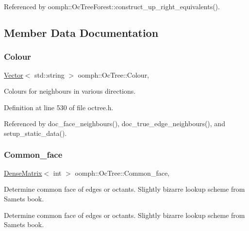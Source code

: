 Referenced by oomph\+::\+Oc\+Tree\+Forest\+::construct\+\_\+up\+\_\+right\+\_\+equivalents().



\subsection{Member Data Documentation}
\mbox{\label{classoomph_1_1OcTree_a11213866602c59eae49ac1c9164b9785}} 
\subsubsection{\texorpdfstring{Colour}{Colour}}
{\footnotesize\ttfamily \hyperlink{classoomph_1_1Vector}{Vector}$<$ std\+::string $>$ oomph\+::\+Oc\+Tree\+::\+Colour\hspace{0.3cm}{\ttfamily [static]}, {\ttfamily [private]}}



Colours for neighbours in various directions. 



Definition at line 530 of file octree.\+h.



Referenced by doc\+\_\+face\+\_\+neighbours(), doc\+\_\+true\+\_\+edge\+\_\+neighbours(), and setup\+\_\+static\+\_\+data().

\mbox{\label{classoomph_1_1OcTree_a50a97dff32038087df0195dcf346405e}} 
\subsubsection{\texorpdfstring{Common\+\_\+face}{Common\_face}}
{\footnotesize\ttfamily \hyperlink{classoomph_1_1DenseMatrix}{Dense\+Matrix}$<$ int $>$ oomph\+::\+Oc\+Tree\+::\+Common\+\_\+face\hspace{0.3cm}{\ttfamily [static]}, {\ttfamily [private]}}



Determine common face of edges or octants. Slightly bizarre lookup scheme from Samet\textquotesingle{}s book. 

Determine common face of edges or octants. Slightly bizarre lookup scheme from Samet\textquotesingle{}s book. 

